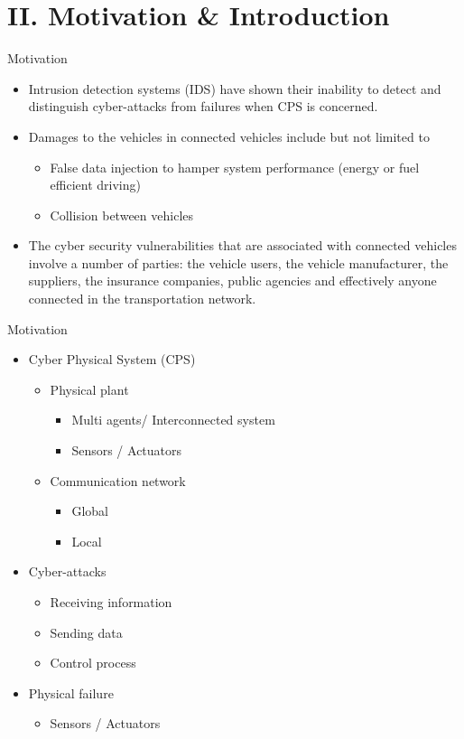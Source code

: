 \documentclass[style=simple]{powerdot}
\begin{document}
\section[tocsection=true,slide=false]{II. Motivation \& Introduction}
\begin{slide}{Motivation}
\begin{itemize}
\item Intrusion detection systems (IDS) have shown their inability to detect and distinguish cyber-attacks from failures when CPS is concerned.
\item Damages to the vehicles in connected vehicles include but not limited to 
\begin{itemize}
\small 
\item False data injection to hamper system performance (energy or fuel efficient driving)
\item Collision between vehicles
\normalsize
\end{itemize}
\item The cyber security vulnerabilities that are associated with connected vehicles involve a number of parties: the vehicle users, the vehicle manufacturer, the suppliers, the insurance companies, public agencies and effectively anyone connected in the transportation network.
\end{itemize}
\end{slide}

\begin{slide}{Motivation}
\begin{itemize}
\item Cyber Physical System (CPS)
\begin{itemize}
\small 
\item Physical plant
\begin{itemize}
\small 
\item Multi agents/ Interconnected system 
\item Sensors / Actuators 
\normalsize
\end{itemize}
\item Communication network
\begin{itemize}
\small 
\item Global
\item Local 
\normalsize
\end{itemize}
\normalsize
\end{itemize}
\item Cyber-attacks
\begin{itemize}
\small 
\item Receiving information 
\item Sending data
\item Control process
\normalsize
\end{itemize}
\item Physical failure 
\begin{itemize}
\small 
\item Sensors / Actuators
\normalsize
\end{itemize}
\end{itemize}
\end{slide}
\end{document}
